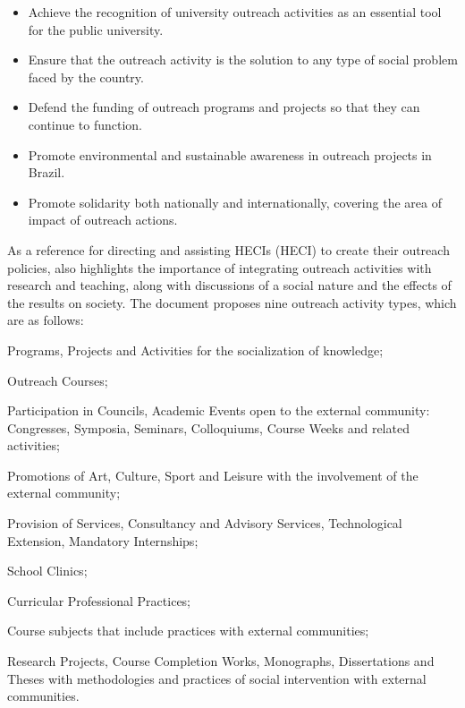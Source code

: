 \begin{itemize}
  \item Achieve the recognition of university outreach activities as an essential tool for the public university.
  \item Ensure that the outreach activity is the solution to any type of social problem faced by the country.
  \item Defend the funding of outreach programs and projects so that they can continue to function.
  \item Promote environmental and sustainable awareness in outreach projects in Brazil.
  \item Promote solidarity both nationally and internationally, covering the area of impact of outreach actions.
\end{itemize}

As a reference for directing and assisting \aclp{HECI} (\ac{HECI}) to create their outreach policies, \cite{referenciaisPolitica} also highlights the importance of integrating outreach activities with research and teaching, along with discussions of a social nature and the effects of the results on society. The document proposes nine outreach activity types, which are as follows:

\begin{inparaenum}[(1)]
  \item Programs, Projects and Activities for the socialization of knowledge;
  \item Outreach Courses;
  \item Participation in Councils, Academic Events open to the external community: Congresses, Symposia, Seminars, Colloquiums, Course Weeks and related activities;
  \item Promotions of Art, Culture, Sport and Leisure with the involvement of the external community;
  \item Provision of Services, Consultancy and Advisory Services, Technological Extension, Mandatory Internships;
  \item School Clinics;
  \item Curricular Professional Practices;
  \item Course subjects that include practices with external communities;
  \item Research Projects, Course Completion Works,
  Monographs, Dissertations and Theses with methodologies and practices of social intervention with external communities.
\end{inparaenum}

